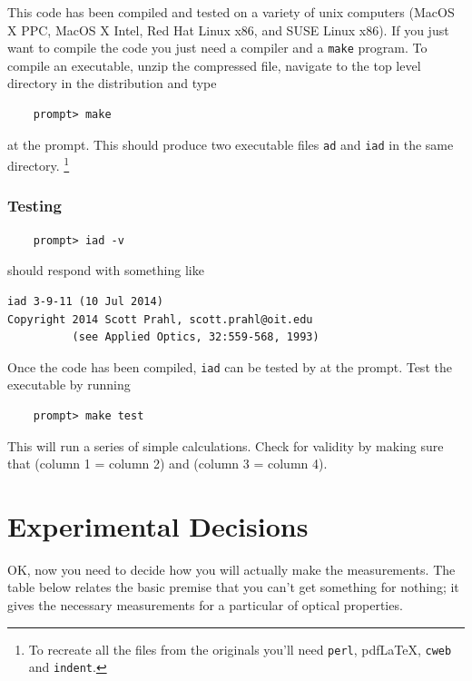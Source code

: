 \documentclass{article}
\newcommand\pdflatex{pdf\LaTeX}
\newcommand\iadprog{\texttt{iad}}
\begin{document}
This code has been compiled and tested on a variety of unix computers (MacOS X PPC, MacOS X Intel,
Red Hat Linux x86, and SUSE Linux x86).  
If you just want to compile the code you just need a compiler and a \texttt{make} program.
To compile an executable,  unzip the compressed file, navigate to the top level directory in the distribution and type
\begin{verbatim}
    prompt> make
\end{verbatim}
at the prompt.  This should produce two executable files \texttt{ad} and \iadprog{} in the 
same directory.%
\footnote{To recreate all the files
from the originals you'll need \texttt{perl}, \pdflatex{}, \texttt{cweb} and \texttt{indent}.}

\subsubsection{Testing}
\begin{verbatim}
    prompt> iad -v
\end{verbatim}
should respond with something like
\begin{verbatim}
iad 3-9-11 (10 Jul 2014)
Copyright 2014 Scott Prahl, scott.prahl@oit.edu
          (see Applied Optics, 32:559-568, 1993)
\end{verbatim}

Once the code has been compiled, \iadprog{} can be tested by
at the prompt.  Test the executable by running
\begin{verbatim}
    prompt> make test
\end{verbatim}
This will run a series of simple calculations.  Check for validity by making sure
that (column 1 = column 2) and (column 3 = column 4).

\clearpage

\section{Experimental Decisions}

OK, now you need to decide how you will actually make the measurements. The table
below relates the basic premise that you can't get something for nothing; it gives
the necessary measurements for a particular of optical properties.
\end{document}
